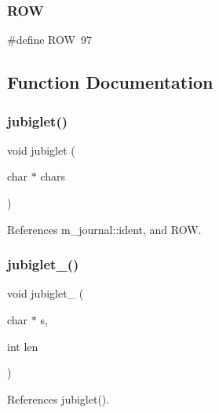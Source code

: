 \mbox{\label{C-jubiglet_8c_ac6f18a9e1d00b4637522b1b469a92021}} 
\subsubsection{\texorpdfstring{R\+OW}{ROW}}
{\footnotesize\ttfamily \#define R\+OW~97}



\subsection{Function Documentation}
\mbox{\label{C-jubiglet_8c_adc484767e979a59ef703547d98fab384}} 
\subsubsection{\texorpdfstring{jubiglet()}{jubiglet()}}
{\footnotesize\ttfamily void jubiglet (\begin{DoxyParamCaption}\item[{char $\ast$}]{chars }\end{DoxyParamCaption})}



References m\+\_\+journal\+::ident, and R\+OW.

\mbox{\label{C-jubiglet_8c_a6a4a6c766aa968996649c44415282c91}} 
\subsubsection{\texorpdfstring{jubiglet\+\_\+()}{jubiglet\_()}}
{\footnotesize\ttfamily void jubiglet\+\_\+ (\begin{DoxyParamCaption}\item[{char $\ast$}]{s,  }\item[{int}]{len }\end{DoxyParamCaption})}



References jubiglet().

